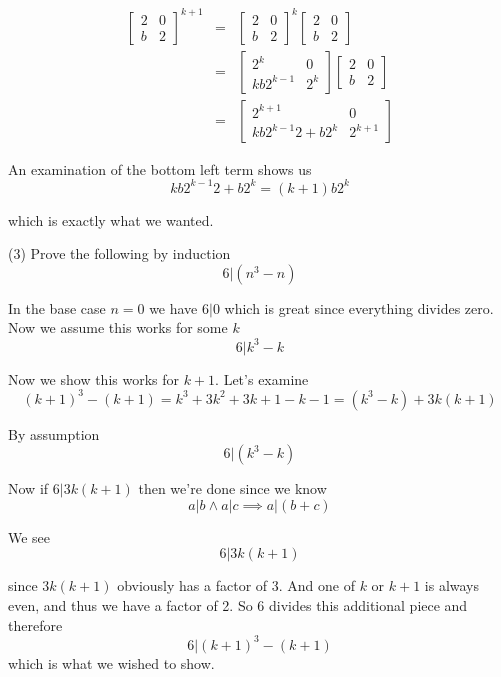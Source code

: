 \documentclass{amsart}
\theoremstyle{definition}
\theoremstyle{remark}
\numberwithin{equation}{section}
\begin{document}
\begin{eqnarray}
\begin{bmatrix}
2 & 0 \\
b & 2
\end{bmatrix}^{k+1} & = &
\begin{bmatrix}
2 & 0 \\
b & 2
\end{bmatrix}^k  
\begin{bmatrix}
2 & 0\\
b & 2
\end{bmatrix} \nonumber \\
& = & 
\begin{bmatrix}
2^k & 0\\
kb2^{k-1} & 2^k
\end{bmatrix}
\begin{bmatrix}
2 & 0 \\
b & 2
\end{bmatrix} \nonumber \\
& = &
\begin{bmatrix}
2^{k+1} & 0\\
kb2^{k-1}2 + b2^k & 2^{k+1}
\end{bmatrix}\nonumber
\end{eqnarray}


An examination of the bottom left term shows us
\[
kb2^{k-1}2 + b2^k = (k+1)b2^k
\]

which is exactly what we wanted. 

\vspace{1in}

(3) Prove the following by induction
\[
6|(n^3-n)
\]

In the base case $n=0$ we have $6|0$ which is great since everything divides zero. Now we assume this works for some $k$
\[
6|k^3-k
\]

Now we show this works for $k+1$.  Let's examine
\[
(k+1)^3  - (k+1) = k^3+3k^2+3k+1-k-1 = (k^3-k) + 3k(k+1)
\]

By assumption 
\[
6|(k^3-k)
\]

Now if $6|3k(k+1)$ then we're done since we know
\[
a|b \wedge a|c \implies a|(b+c)
\]

We see 
\[
6|3k(k+1)
\]

since $3k(k+1)$ obviously has a factor of 3.  And one of $k$ or $k+1$ is always even, and thus we have a factor of 2.  So 6 divides this additional piece and therefore
\[
6|(k+1)^3-(k+1)
\]
which is what we wished to show.

\vspace{1in}
\end{document}
